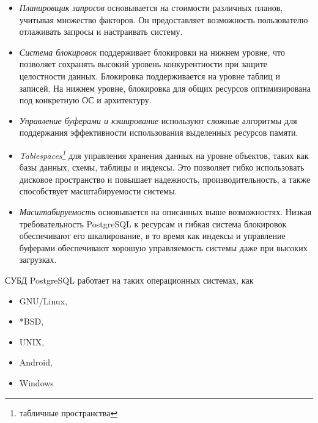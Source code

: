 \documentclass[a4paper,12pt,notitlepage,headsepline,pdftex]{scrartcl}
\begin{document}
\begin{itemize}
\begin{itemize}
          \verb'create index idx_partial on foo (x) where x > 0;'
        \item \textbf{Функциональные индексы\footnote{expressional indices}}
          позволяют создавать индексы используя значения функции от параметра,
          например,

          \verb'create index idx_functional on foo ( length(x) );'
      \end{itemize}
    \item \emph{Планировщик запросов} основывается на стоимости различных
      планов, учитывая множество факторов.
      Он предоставляет возможность пользователю отлаживать запросы и
      настраивать систему.
    \item \emph{Система блокировок} поддерживает блокировки на нижнем уровне,
      что позволяет сохранять высокий уровень конкурентности при защите
      целостности данных.
      Блокировка поддерживается на уровне таблиц и записей. На нижнем уровне,
      блокировка для общих ресурсов оптимизирована под конкретную ОС и
      архитектуру.
    \item \emph{Управление буферами и кэширование} используют сложные
      алгоритмы для поддержания эффективности использования выделенных
      ресурсов памяти.
    \item \emph{Tablespaces\footnote{табличные пространства}} для управления
      хранения данных на уровне объектов, таких как базы данных, схемы,
      таблицы и индексы.
      Это позволяет гибко использовать дисковое пространство и повышает
      надежность, производительность, а также способствует масштабируемости
      системы.
    \item \emph{Масштабируемость} основывается на описанных выше возможностях.
      Низкая требовательность PostgreSQL к ресурсам и гибкая система
      блокировок обеспечивают его шкалирование, в то время как индексы и
      управление буферами обеспечивают хорошую управляемость системы даже при
      высоких загрузках.
  \end{itemize}\cite{prpsql}

  СУБД PostgreSQL работает на таких операционных системах, как
  \begin{itemize}
    \item GNU/Linux,
    \item *BSD,
    \item UNIX,
    \item Android,
    \item Windows
  \end{itemize}\cite{enwiki}
\end{document}
